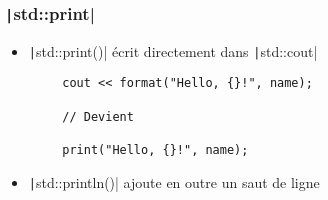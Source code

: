 \documentclass[C++.tex]{subfiles}
\begin{document}
\begin{frame}[fragile]
	\frametitle{\texttt|std::print|}
	\begin{itemize}
		\item \texttt|std::print()| écrit directement dans \texttt|std::cout|
	\end{itemize}

	\begin{verbatim}
		cout << format("Hello, {}!", name);

		// Devient

		print("Hello, {}!", name);
	\end{verbatim}

	\begin{itemize}
		\item \texttt|std::println()| ajoute en outre un saut de ligne
	\end{itemize}


\end{frame}
\end{document}
